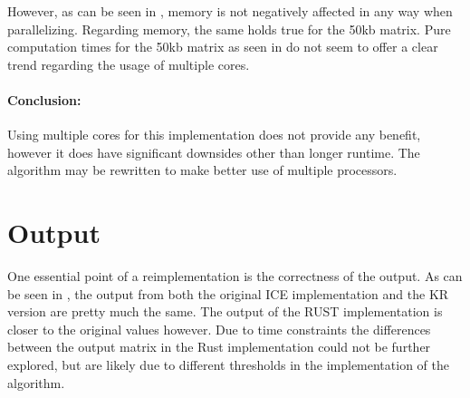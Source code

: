 


However, as can be seen in , memory is not negatively
affected in any way when parallelizing. Regarding memory, the same holds true for
the 50kb matrix. Pure computation times for the 50kb matrix as seen in
 do not seem to offer a clear trend regarding the usage of
multiple cores.


\paragraph{Conclusion:} Using multiple cores for this implementation does not
provide any benefit, however it does have significant downsides other than
longer runtime. The algorithm may be rewritten to make better use of multiple
processors.



\section{Output}



One essential point of a reimplementation is the correctness of the output.
As can be seen in , the output from both the original ICE
implementation and the KR version are pretty much the same. The output of the
RUST implementation is closer to the original values however. Due to time
constraints the differences between the output matrix in the Rust implementation
could not be further explored, but are likely due to different thresholds in
the implementation of the algorithm.






